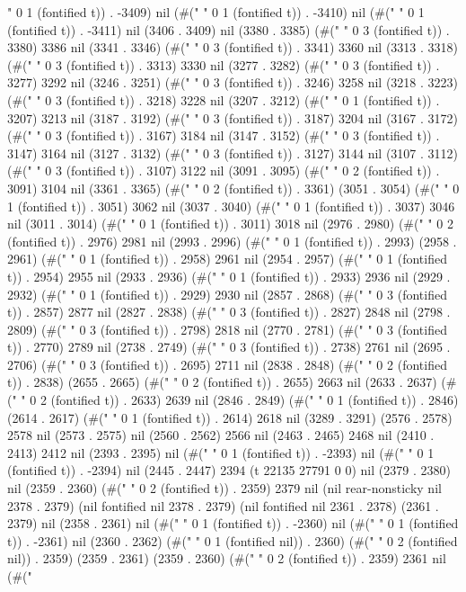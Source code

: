 " 0 1 (fontified t)) . -3409) nil (#(" " 0 1 (fontified t)) . -3410) nil (#(" " 0 1 (fontified t)) . -3411) nil (3406 . 3409) nil (3380 . 3385) (#("   " 0 3 (fontified t)) . 3380) 3386 nil (3341 . 3346) (#("   " 0 3 (fontified t)) . 3341) 3360 nil (3313 . 3318) (#("   " 0 3 (fontified t)) . 3313) 3330 nil (3277 . 3282) (#("   " 0 3 (fontified t)) . 3277) 3292 nil (3246 . 3251) (#("   " 0 3 (fontified t)) . 3246) 3258 nil (3218 . 3223) (#("   " 0 3 (fontified t)) . 3218) 3228 nil (3207 . 3212) (#(" " 0 1 (fontified t)) . 3207) 3213 nil (3187 . 3192) (#("   " 0 3 (fontified t)) . 3187) 3204 nil (3167 . 3172) (#("   " 0 3 (fontified t)) . 3167) 3184 nil (3147 . 3152) (#("   " 0 3 (fontified t)) . 3147) 3164 nil (3127 . 3132) (#("   " 0 3 (fontified t)) . 3127) 3144 nil (3107 . 3112) (#("   " 0 3 (fontified t)) . 3107) 3122 nil (3091 . 3095) (#("  " 0 2 (fontified t)) . 3091) 3104 nil (3361 . 3365) (#("  " 0 2 (fontified t)) . 3361) (3051 . 3054) (#(" " 0 1 (fontified t)) . 3051) 3062 nil (3037 . 3040) (#(" " 0 1 (fontified t)) . 3037) 3046 nil (3011 . 3014) (#(" " 0 1 (fontified t)) . 3011) 3018 nil (2976 . 2980) (#("  " 0 2 (fontified t)) . 2976) 2981 nil (2993 . 2996) (#(" " 0 1 (fontified t)) . 2993) (2958 . 2961) (#(" " 0 1 (fontified t)) . 2958) 2961 nil (2954 . 2957) (#(" " 0 1 (fontified t)) . 2954) 2955 nil (2933 . 2936) (#(" " 0 1 (fontified t)) . 2933) 2936 nil (2929 . 2932) (#(" " 0 1 (fontified t)) . 2929) 2930 nil (2857 . 2868) (#("   " 0 3 (fontified t)) . 2857) 2877 nil (2827 . 2838) (#("   " 0 3 (fontified t)) . 2827) 2848 nil (2798 . 2809) (#("   " 0 3 (fontified t)) . 2798) 2818 nil (2770 . 2781) (#("   " 0 3 (fontified t)) . 2770) 2789 nil (2738 . 2749) (#("   " 0 3 (fontified t)) . 2738) 2761 nil (2695 . 2706) (#("   " 0 3 (fontified t)) . 2695) 2711 nil (2838 . 2848) (#("  " 0 2 (fontified t)) . 2838) (2655 . 2665) (#("  " 0 2 (fontified t)) . 2655) 2663 nil (2633 . 2637) (#("  " 0 2 (fontified t)) . 2633) 2639 nil (2846 . 2849) (#(" " 0 1 (fontified t)) . 2846) (2614 . 2617) (#(" " 0 1 (fontified t)) . 2614) 2618 nil (3289 . 3291) (2576 . 2578) 2578 nil (2573 . 2575) nil (2560 . 2562) 2566 nil (2463 . 2465) 2468 nil (2410 . 2413) 2412 nil (2393 . 2395) nil (#(" " 0 1 (fontified t)) . -2393) nil (#(" " 0 1 (fontified t)) . -2394) nil (2445 . 2447) 2394 (t 22135 27791 0 0) nil (2379 . 2380) nil (2359 . 2360) (#("  " 0 2 (fontified t)) . 2359) 2379 nil (nil rear-nonsticky nil 2378 . 2379) (nil fontified nil 2378 . 2379) (nil fontified nil 2361 . 2378) (2361 . 2379) nil (2358 . 2361) nil (#(" " 0 1 (fontified t)) . -2360) nil (#(" " 0 1 (fontified t)) . -2361) nil (2360 . 2362) (#(" " 0 1 (fontified nil)) . 2360) (#("  " 0 2 (fontified nil)) . 2359) (2359 . 2361) (2359 . 2360) (#("  " 0 2 (fontified t)) . 2359) 2361 nil (#("
